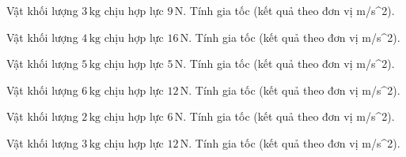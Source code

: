 \begin{ex}
Vật khối lượng $3\,\text{kg}$ chịu hợp lực $9\,\text{N}$. Tính gia tốc (kết quả theo đơn vị m/s^2).
\end{ex}

\begin{ex}
Vật khối lượng $4\,\text{kg}$ chịu hợp lực $16\,\text{N}$. Tính gia tốc (kết quả theo đơn vị m/s^2).
\end{ex}

\begin{bt}
Vật khối lượng $5\,\text{kg}$ chịu hợp lực $5\,\text{N}$. Tính gia tốc (kết quả theo đơn vị m/s^2).
\end{bt}

\begin{bt}
Vật khối lượng $6\,\text{kg}$ chịu hợp lực $12\,\text{N}$. Tính gia tốc (kết quả theo đơn vị m/s^2).
\end{bt}

\begin{bt}
Vật khối lượng $2\,\text{kg}$ chịu hợp lực $6\,\text{N}$. Tính gia tốc (kết quả theo đơn vị m/s^2).
\end{bt}

\begin{bt}
Vật khối lượng $3\,\text{kg}$ chịu hợp lực $12\,\text{N}$. Tính gia tốc (kết quả theo đơn vị m/s^2).
\end{bt}

